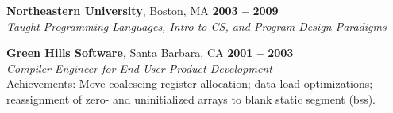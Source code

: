 \documentclass[margin,line,draft]{res}
\def\noneed#1{}
\def\coursetitle#1{\textsl{#1}}
\def\coursenum#1{#1}
\def\course#1#2{\coursenum{#1} \coursetitle{#2}}
\begin{document}
\begin{resume}
\newpage

    \textbf{Northeastern University}, Boston, MA \hfill \textbf{2003 -- 2009}\\\vspace{1mm}%
    \textsl{Taught Programming Languages, Intro to CS, and Program Design Paradigms}

    \textbf{Green Hills Software}, Santa Barbara, CA \hfill \textbf{2001 -- 2003}\\\vspace{1mm}%
    \textsl{Compiler Engineer for End-User Product Development}
    \\
    Achievements: Move-coalescing register allocation; data-load optimizations; reassignment of zero- and uninitialized arrays to blank static segment (bss).
%
% 
% 
% 

\noneed{
    \textbf{ESP High School Studies Program}, Cambridge, MA \vspace{2mm}\\\vspace{1mm}%
    \textsl{Instructor} \hfill \textbf{2001 -- 2001}\\
    Volunteer Instructor M-20A: \coursetitle{Square Peg Solutions}
    \noneed{Problem Solving via Decomposition, Visualization, and Abstraction}
}


\end{resume}
\end{document}

